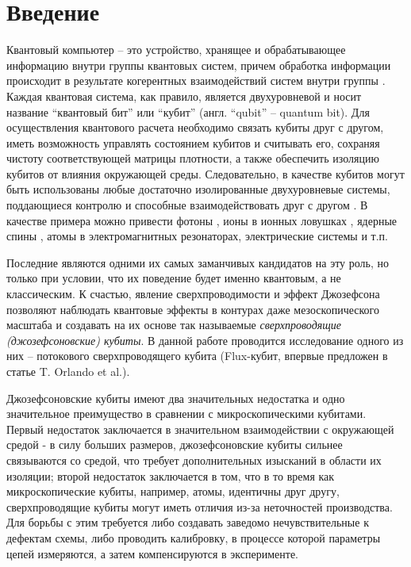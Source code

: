 \documentclass[12pt, twoside]{report}
\numberwithin{equation}{section}
\numberwithin{figure}{section}
\begin{document}

\tableofcontents
\newpage

\chapter{Введение}
Квантовый компьютер -- это устройство, хранящее и обрабатывающее информацию внутри группы квантовых систем, причем обработка информации происходит в результате когерентных взаимодействий систем внутри группы \cite{Lloyd1993}. Каждая квантовая система, как правило, является двухуровневой и носит название ``квантовый бит'' или ``кубит'' (англ. ``qubit'' -- quantum bit). Для осуществления квантового расчета необходимо связать кубиты друг с другом, иметь возможность управлять состоянием кубитов и считывать его, сохраняя чистоту соответствующей матрицы плотности, а также обеспечить изоляцию кубитов от влияния окружающей среды. Следовательно, в качестве кубитов могут быть использованы любые достаточно изолированные двухуровневые системы, поддающиеся контролю и способные взаимодействовать друг с другом \cite{DiVincenzo1995, DiVincenzo2000, Spiller1996}. В качестве примера можно привести фотоны \cite{Milburn2009}, ионы в ионных ловушках \cite{Cirac1995}, ядерные спины \cite{Kane1998}, атомы в электромагнитных резонаторах\cite{Rempe2008},  электрические системы\cite{Devoret2005} и т.п.

Последние являются одними их самых заманчивых кандидатов на эту роль, но только при условии, что их поведение будет именно квантовым, а не классическим\cite{Devoret1995}. К счастью, явление сверхпроводимости и эффект Джозефсона позволяют наблюдать квантовые эффекты в контурах даже мезоскопического масштаба и создавать на их основе так называемые \textit{сверхпроводящие (джозефсоновские) кубиты}\cite{Clarke2008}. В данной работе проводится исследование одного из них -- потокового сверхпроводящего кубита (Flux-кубит, впервые предложен в статье T. Orlando et al.\cite{Orlando1999}).

Джозефсоновские кубиты имеют два значительных недостатка и одно значительное преимущество в сравнении с микроскопическими кубитами. Первый недостаток заключается в значительном взаимодействии с окружающей средой - в силу больших размеров, джозефсоновские кубиты сильнее связываются со средой, что требует дополнительных изысканий в области их изоляции; второй недостаток заключается в том, что в то время как микроскопические кубиты, например, атомы, идентичны друг другу, сверхпроводящие кубиты могут иметь отличия из-за неточностей производства. Для борьбы с этим требуется либо создавать заведомо нечувствительные к дефектам схемы, либо проводить калибровку, в процессе которой параметры цепей измеряются, а затем компенсируются в эксперименте.
\end{document}
